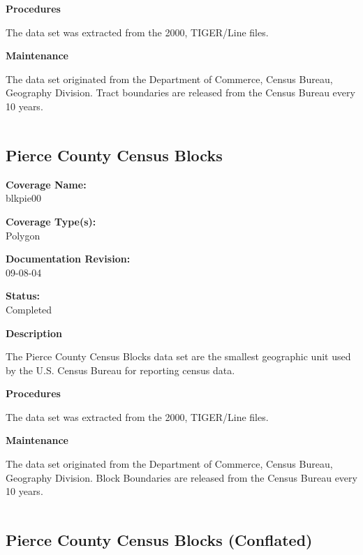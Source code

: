 {\bf \large Procedures}

The data set was extracted from the 2000, TIGER/Line files.

{\bf \large Maintenance}

The data set originated from the Department of Commerce, Census
Bureau, Geography Division. Tract boundaries are released from the
Census Bureau every 10 years.

\begin{landscape}
\begin{longtable}{llrrrrrc}

\end{longtable}
\end{landscape}
\newpage

\subsection{Pierce County Census Blocks}

{\bf \large Coverage Name:}\\
blkpie00

{\bf \large Coverage Type(s):}\\
Polygon

{\bf \large Documentation Revision:}\\
09-08-04

{\bf \large Status:}\\
Completed

{\bf \large Description}

The Pierce County Census Blocks data set are the smallest
geographic unit used by the U.S. Census Bureau for reporting
census data.

{\bf \large Procedures}

The data set was extracted from the 2000, TIGER/Line files.

{\bf \large Maintenance}

The data set originated from the Department of Commerce, Census
Bureau, Geography Division. Block Boundaries are released from the
Census Bureau every 10 years.

\begin{landscape}
\begin{longtable}{llrrrrrc}

\end{longtable}
\end{landscape}
\newpage

\subsection{Pierce County Census Blocks (Conflated)}

